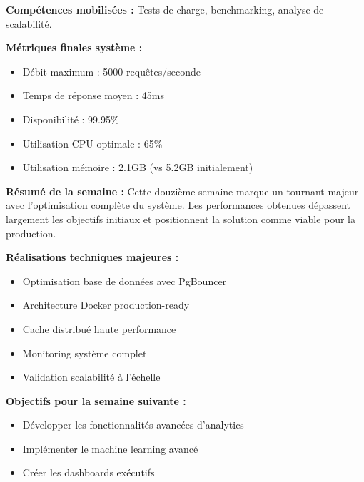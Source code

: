 \textbf{Compétences mobilisées :}
Tests de charge, benchmarking, analyse de scalabilité.

\textbf{Métriques finales système :}
\begin{itemize}
    \item Débit maximum : 5000 requêtes/seconde
    \item Temps de réponse moyen : 45ms
    \item Disponibilité : 99.95\%
    \item Utilisation CPU optimale : 65\%
    \item Utilisation mémoire : 2.1GB (vs 5.2GB initialement)
\end{itemize}

\textbf{Résumé de la semaine :}
Cette douzième semaine marque un tournant majeur avec l'optimisation complète du système. Les performances obtenues dépassent largement les objectifs initiaux et positionnent la solution comme viable pour la production.

\textbf{Réalisations techniques majeures :}
\begin{itemize}
    \item Optimisation base de données avec PgBouncer
    \item Architecture Docker production-ready
    \item Cache distribué haute performance
    \item Monitoring système complet
    \item Validation scalabilité à l'échelle
\end{itemize}

\textbf{Objectifs pour la semaine suivante :}
\begin{itemize}
    \item Développer les fonctionnalités avancées d'analytics
    \item Implémenter le machine learning avancé
    \item Créer les dashboards exécutifs
\end{itemize}